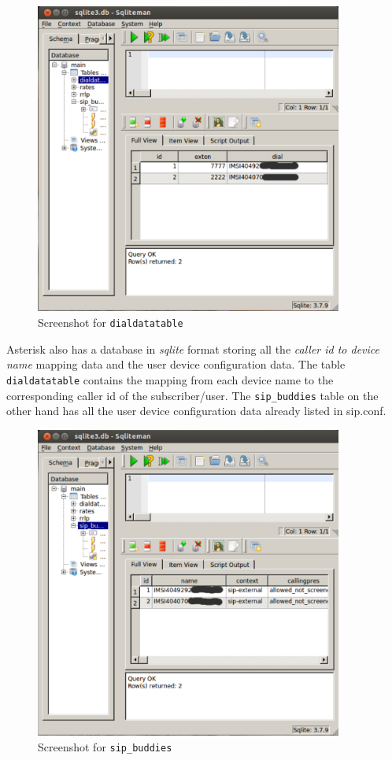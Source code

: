 \begin{figure}
  \centering
    \includegraphics[width=0.9\textwidth]{../images/dialdata}
  \caption[Screenshot - dialdatatable]{Screenshot for \texttt{dialdatatable}}
  \label{dialdata}
\end{figure}

Asterisk also has a database in \textsl{sqlite} format storing all the 
\emph{caller id to device name} mapping data and the user device configuration
data. The table \texttt{dialdatatable} contains the mapping from each device
name to the corresponding caller id of the subscriber/user. The
\texttt{sip\_buddies} table on the other hand has all the user device 
configuration data already listed in \textsf{sip.conf}.

\begin{figure}
  \centering
    \includegraphics[width=0.9\textwidth]{../images/sipbuddies}
  \caption[Screenshot - sip\_buddies]{Screenshot for \texttt{sip\_buddies}}
  \label{sipbuddies}
\end{figure}


